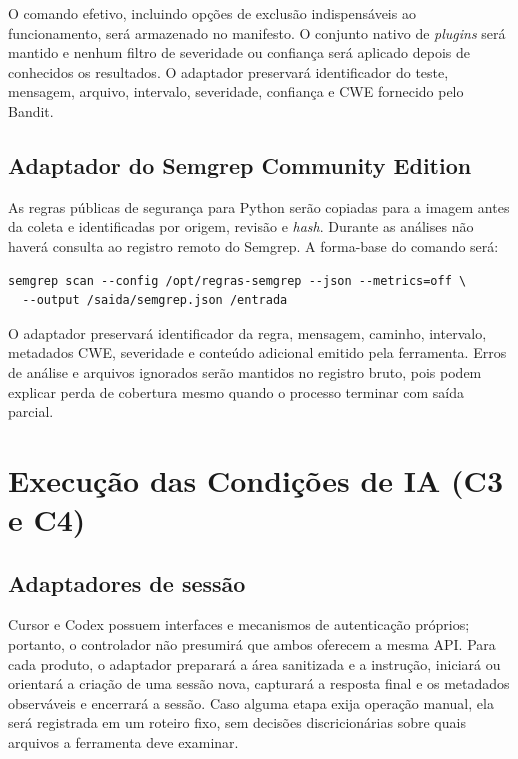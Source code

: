 O comando efetivo, incluindo opções de exclusão indispensáveis ao funcionamento, será armazenado no manifesto. O conjunto nativo de \textit{plugins} será mantido e nenhum filtro de severidade ou confiança será aplicado depois de conhecidos os resultados. O adaptador preservará identificador do teste, mensagem, arquivo, intervalo, severidade, confiança e CWE fornecido pelo Bandit.

\subsection{Adaptador do Semgrep Community Edition}\label{subsec:execucao-semgrep}

As regras públicas de segurança para Python serão copiadas para a imagem antes da coleta e identificadas por origem, revisão e \textit{hash}. Durante as análises não haverá consulta ao registro remoto do Semgrep. A forma-base do comando será:

\begin{verbatim}
semgrep scan --config /opt/regras-semgrep --json --metrics=off \
  --output /saida/semgrep.json /entrada
\end{verbatim}

O adaptador preservará identificador da regra, mensagem, caminho, intervalo, metadados CWE, severidade e conteúdo adicional emitido pela ferramenta. Erros de análise e arquivos ignorados serão mantidos no registro bruto, pois podem explicar perda de cobertura mesmo quando o processo terminar com saída parcial.

\section{Execução das Condições de IA (C3 e C4)}\label{sec:execucao-ia-desenvolvimento}

\subsection{Adaptadores de sessão}\label{subsec:adaptadores-sessao-ia}

Cursor e Codex possuem interfaces e mecanismos de autenticação próprios; portanto, o controlador não presumirá que ambos oferecem a mesma API. Para cada produto, o adaptador preparará a área sanitizada e a instrução, iniciará ou orientará a criação de uma sessão nova, capturará a resposta final e os metadados observáveis e encerrará a sessão. Caso alguma etapa exija operação manual, ela será registrada em um roteiro fixo, sem decisões discricionárias sobre quais arquivos a ferramenta deve examinar.


